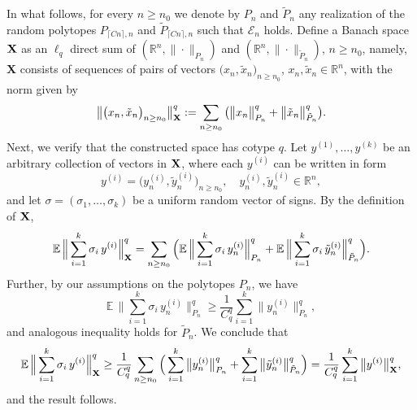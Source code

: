 \documentclass[11pt]{amsart}
\theoremstyle{definition}
\theoremstyle{plain}
\newcommand{\R}{\mathbb{R}}
\newcommand{\Event}{\mathcal{E}}
\def\R{{\mathbb R}}
\def\Exp{{\mathbb E}}
\def\Event{{\mathcal E}}
\begin{document}
In what follows, for every $n\geq n_0$
we denote by $P_{n}$ and $\tilde P_{n}$
any realization of the random polytopes
$P_{\lceil Cn\rceil,n}$ and $\tilde P_{\lceil Cn\rceil,n}$
such that $\Event_n$ holds.
Define a Banach space ${\bf X}$
as an $\ell_q$ direct sum of $(\R^n,\|\cdot\|_{P_{n}})$
and $(\R^n,\|\cdot\|_{\tilde P_{n}})$, $n\geq n_0$,
namely, {\bf X} consists of
sequences
of pairs of vectors $\big(x_n,\tilde x_n\big)_{n\geq n_0}$, $x_n,\tilde x_n\in \R^n$,
with the norm given by
$$
\big\|\big(x_n,\tilde x_n\big)_{n\geq n_0}\big\|_{\bf X}^q
:=
\sum_{n\geq n_0}\big(\big\|x_n\big\|_{P_{n}}^q+
\big\|\tilde x_n\big\|_{\tilde P_{n}}^q
\big).
$$
Next, we verify that the constructed space has cotype $q$.
Let $y^{(1)},\dots,y^{(k)}$
be an arbitrary collection of vectors in ${\bf X}$,
where each $y^{(i)}$
can be written in form 
$$y^{(i)}
=\big(y^{(i)}_n,\tilde y^{(i)}_n\big)_{n\geq n_0},
\quad y^{(i)}_n,\tilde y^{(i)}_n\in\R^n,$$
and let $\sigma=(\sigma_1,\dots,\sigma_k)$
be a uniform random vector of signs.
By the definition of ${\bf X}$,
$$
\Exp\,\Big\|
    \sum_{i=1}^k \sigma_i\,y^{(i)}
    \Big\|_{\bf X}^q
    =
    \sum_{n\geq n_0}\Big(
    \Exp\,\Big\|
    \sum_{i=1}^k \sigma_i\,y^{(i)}_n
    \Big\|_{P_{n}}^q
    +
    \Exp\,\Big\|
    \sum_{i=1}^k \sigma_i\,\tilde y^{(i)}_n
    \Big\|_{\tilde P_{n}}^q
    \Big).
$$
Further, by our assumptions on the polytopes
$P_{n}$, we have
$$
\Exp\,\Big\|
    \sum_{i=1}^k \sigma_i\,y^{(i)}_n
    \Big\|_{P_{n}}^q
    \geq \frac{1}{C_q^q}
    \sum_{i=1}^k \big\|y^{(i)}_n
    \big\|_{P_{n}}^q,
$$
and analogous inequality holds for $\tilde P_{n}$.
We conclude that
$$
\Exp\,\Big\|
    \sum_{i=1}^k \sigma_i\,y^{(i)}
    \Big\|_{\bf X}^q
    \geq 
    \frac{1}{C_q^q}
    \sum_{n\geq n_0}\Big(
    \sum_{i=1}^k \big\|y^{(i)}_n
    \big\|_{P_{n}}^q
    +
    \sum_{i=1}^k \big\|\tilde y^{(i)}_n
    \big\|_{\tilde P_{n}}^q
    \Big)
    =\frac{1}{C_q^q}
    \sum_{i=1}^k \big\|y^{(i)}
    \big\|_{\bf X}^q,
$$
and the result follows.
\end{document}
